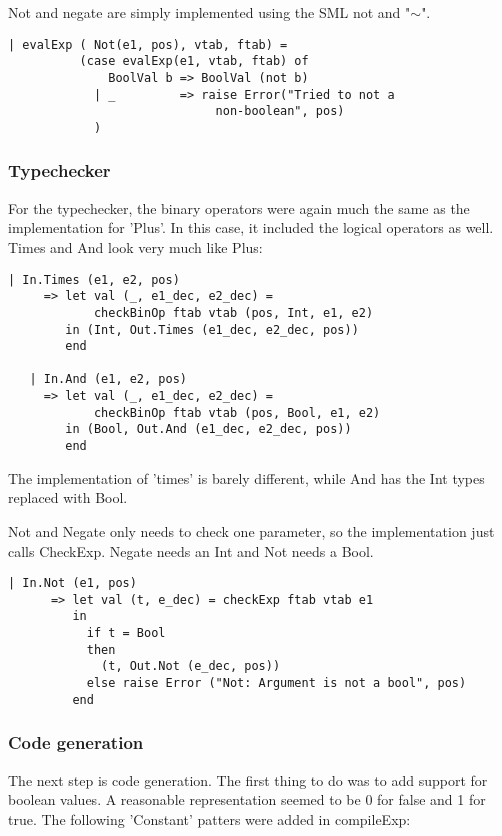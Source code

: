\documentclass[10pt]{article}
\begin{document}
Not and negate are simply implemented using the SML not and "$\sim$".

\begin{Verbatim}[frame=single]
    | evalExp ( Not(e1, pos), vtab, ftab) =
          (case evalExp(e1, vtab, ftab) of
              BoolVal b => BoolVal (not b)
            | _         => raise Error("Tried to not a
            				 non-boolean", pos)
            )
\end{Verbatim}

\subsubsection{Typechecker}
For the typechecker, the binary operators were again much the same as the implementation for 'Plus'. In this case, it included the logical operators as well. Times and And look very much like Plus:

\begin{Verbatim}[frame=single]
   | In.Times (e1, e2, pos)
     => let val (_, e1_dec, e2_dec) = 
     		checkBinOp ftab vtab (pos, Int, e1, e2)
        in (Int, Out.Times (e1_dec, e2_dec, pos))
        end

   | In.And (e1, e2, pos)
     => let val (_, e1_dec, e2_dec) = 
     		checkBinOp ftab vtab (pos, Bool, e1, e2) 
        in (Bool, Out.And (e1_dec, e2_dec, pos))
        end
\end{Verbatim}

The implementation of 'times' is barely different, while And has the Int types replaced with Bool. 

Not and Negate only needs to check one parameter, so the implementation just calls CheckExp. Negate needs an Int and Not needs a Bool.

\begin{Verbatim}[frame=single]
   | In.Not (e1, pos)
      => let val (t, e_dec) = checkExp ftab vtab e1
         in
           if t = Bool
           then
             (t, Out.Not (e_dec, pos))
           else raise Error ("Not: Argument is not a bool", pos)
         end
\end{Verbatim}

\subsubsection{Code generation}
The next step is  code generation. The first thing to do was to add support for boolean values. A reasonable representation seemed to be 0 for false and 
1 for true. The following 'Constant' patters were added in compileExp:
\end{document}
